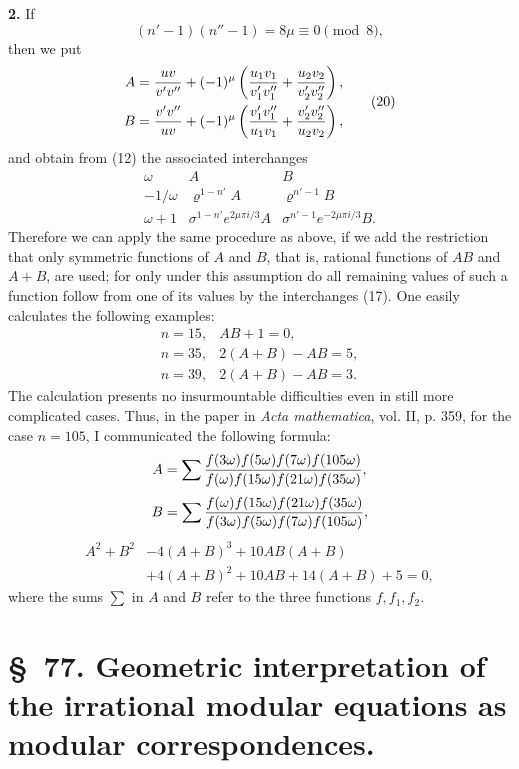 \documentclass[11pt]{article}
\begin{document}
\noindent\textbf{2.} If
\[
 (n'-1)(n''-1)=8\mu\equiv0\pmod8,
\]
then we put
\begin{equation}
\begin{aligned}
A&={uv\over v'v''}+(-1)^\mu\left({u_1v_1\over v'_1v''_1}+{u_2v_2\over v'_2v''_2}\right),\\
B&={v'v''\over uv}+(-1)^\mu\left({v'_1v''_1\over u_1v_1}+{v'_2v''_2\over u_2v_2}\right),
\end{aligned}
\tag{20}
\end{equation}
and obtain from (12) the associated interchanges
\begin{equation}
\begin{array}{c|cc}
\omega&A&B\\[0.2em]
-1/\omega&\varrho^{1-n'}A&\varrho^{n'-1}B\\[0.2em]
\omega+1&\sigma^{1-n'}e^{2\mu\pi i/3}A&\sigma^{n'-1}e^{-2\mu\pi i/3}B.
\end{array}
\tag{21}
\end{equation}
Therefore we can apply the same procedure as above, if we add the restriction that only symmetric functions of $A$ and $B$, that is, rational functions of $AB$ and $A+B$, are used; for only under this assumption do all remaining values of such a function follow from one of its values by the interchanges (17). One easily calculates the following examples:
\begin{equation}
\begin{array}{rl}
n=15,& AB+1=0,\\
n=35,& 2(A+B)-AB=5,\\
n=39,& 2(A+B)-AB=3.
\end{array}
\tag{22}
\end{equation}
The calculation presents no insurmountable difficulties even in still more complicated cases. Thus, in the paper in \emph{Acta mathematica}, vol. II, p. 359, for the case $n=105$, I communicated the following formula:
\[
 A=\sum {f(3\omega)f(5\omega)f(7\omega)f(105\omega)\over f(\omega)f(15\omega)f(21\omega)f(35\omega)},
\]
\[
 B=\sum {f(\omega)f(15\omega)f(21\omega)f(35\omega)\over f(3\omega)f(5\omega)f(7\omega)f(105\omega)},
\]
\[
\begin{aligned}
 A^2+B^2&-4(A+B)^3+10AB(A+B)\\
&+4(A+B)^2+10AB+14(A+B)+5=0,
\end{aligned}
\]
where the sums $\sum$ in $A$ and $B$ refer to the three functions $f,f_1,f_2$.


\clearpage

\section*{\S~77. Geometric interpretation of the irrational modular equations as modular correspondences.}
\end{document}
